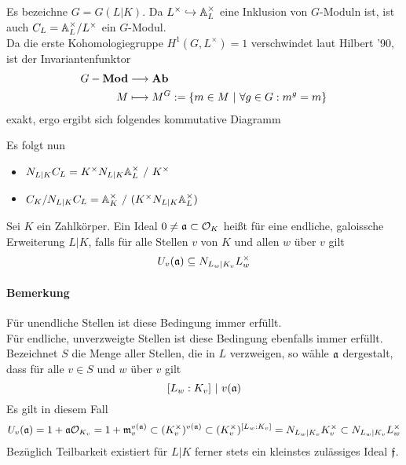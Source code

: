 \Bem{}
Es bezeichne $G = G(L|K)$. Da $L^\times \overset{}{\hookrightarrow} \mathbb{A}_L^\times$ eine Inklusion von $G$-Moduln ist, ist auch $C_L = \mathbb{A}_L^\times / L^\times$ ein $G$-Modul.\\
Da die erste Kohomologiegruppe $H^1(G,L^\times) = 1$ verschwindet laut Hilbert '90, ist der Invariantenfunktor
\begin{align*}
G-\textbf{Mod} & \overset{}{\longrightarrow} \textbf{Ab}\\
M & \longmapsto M^G := \{m \in M ~|~ \forall g \in G: m^g = m\}
\end{align*}
exakt, ergo ergibt sich folgendes kommutative Diagramm
\begin{center}
\end{center}
Es folgt nun
\begin{itemize}
\item $N_{L|K}C_L = K^\times N_{L|K}\mathbb{A}_L^\times ~/~ K^\times$
\item $C_K / N_{L|K}C_L = \mathbb{A}_K^\times ~/~ (K^\times  N_{L|K}\mathbb{A}_L^\times)$
\end{itemize}

Sei $K$ ein Zahlkörper. Ein Ideal $0\neq \mathfrak{a} \subset \mathcal{O}_K$ heißt  für eine endliche, galoissche Erweiterung $L|K$, falls für alle Stellen $v$ von $K$ und allen $w$ über $v$ gilt
\[ U_v(\mathfrak{a}) \subseteq N_{L_w|K_v}L_w^\times \]
\paragraph{Bemerkung} Für unendliche Stellen ist diese Bedingung immer erfüllt.\\
Für endliche, unverzweigte Stellen ist diese Bedingung ebenfalls immer erfüllt.\\
Bezeichnet $S$ die Menge aller Stellen, die in $L$ verzweigen, so wähle $\mathfrak{a}$ dergestalt, dass für alle $v \in S$ und $w$ über $v$ gilt
\[ [L_w : K_v] ~|~ v(\mathfrak{a}) \]
Es gilt in diesem Fall
\[ U_v(\mathfrak{a}) = 1+\mathfrak{a} \mathcal{O}_{K_v} = 1 + \mathfrak{m}_v^{v(\mathfrak{a})} \subset (K^\times_v)^{v(\mathfrak{a})}  \subset (K^\times_v)^{[L_w:K_v]} = N_{L_w|K_v}K^\times_v \subset N_{L_w|K_v}L_w^\times  \]
Bezüglich Teilbarkeit existiert für $L|K$ ferner stets ein kleinstes zulässiges Ideal $\mathfrak{f}$.

